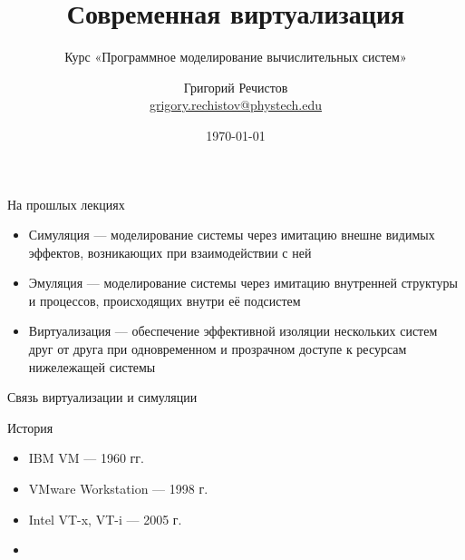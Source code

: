 \documentclass{beamer}
\title{Современная виртуализация}
\subtitle{Курс «Программное моделирование вычислительных систем»}
\author[]{Григорий Речистов \\ \small{\href{mailto:grigory.rechistov@phystech.edu}{grigory.rechistov@phystech.edu}}}
\date{\today}
\begin{document}
\begin{frame}
\titlepage
\end{frame}

\begin{frame}
\tableofcontents
\end{frame}


\begin{frame}{На прошлых лекциях}
\begin{itemize}
\item Симуляция —  моделирование системы через имитацию внешне видимых эффектов, возникающих при взаимодействии с ней
\item Эмуляция — моделирование системы через имитацию внутренней структуры и процессов, происходящих внутри её подсистем
\item Виртуализация — обеспечение эффективной изоляции нескольких систем друг от друга при одновременном и прозрачном доступе к ресурсам нижележащей системы
\end{itemize}

\end{frame}


\begin{frame}{Связь виртуализации и симуляции}

\centering


\vfill



\end{frame}

\begin{frame}{История}
\begin{itemize}
\item IBM VM — 1960 гг. \cite{goldberg}
\item VMware Workstation — 1998 г.
\item Intel VT-x, VT-i — 2005 г.
\item 
\end{itemize}


\end{frame}
\end{document}

